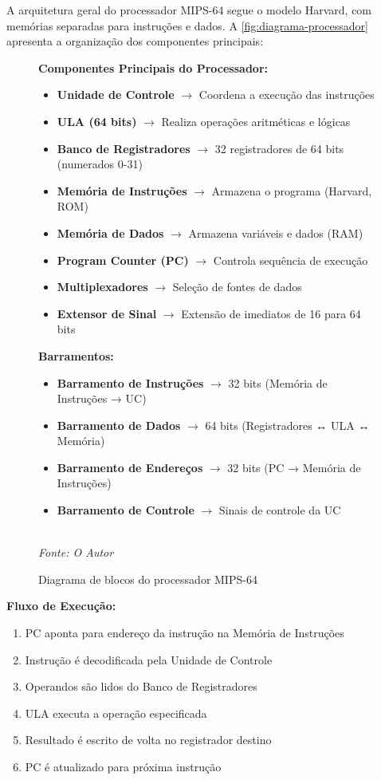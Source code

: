 \documentclass[
	12pt,				%
	oneside,
	a4paper,			%
	english,			%
	french,				%
	spanish,			%
	brazil,				%
	]{abntex2}
\begin{document}
A arquitetura geral do processador MIPS-64 segue o modelo Harvard, com memórias separadas para instruções e dados. A \autoref{fig:diagrama-processador} apresenta a organização dos componentes principais:

\begin{figure}[H]
\centering
\caption{Diagrama de blocos do processador MIPS-64}
\label{fig:diagrama-processador}
\begin{minipage}{0.9\textwidth}
\textbf{Componentes Principais do Processador:}
\begin{itemize}
    \item \textbf{Unidade de Controle} $\rightarrow$ Coordena a execução das instruções
    \item \textbf{ULA (64 bits)} $\rightarrow$ Realiza operações aritméticas e lógicas
    \item \textbf{Banco de Registradores} $\rightarrow$ 32 registradores de 64 bits (numerados 0-31)
    \item \textbf{Memória de Instruções} $\rightarrow$ Armazena o programa (Harvard, ROM)
    \item \textbf{Memória de Dados} $\rightarrow$ Armazena variáveis e dados (RAM)
    \item \textbf{Program Counter (PC)} $\rightarrow$ Controla sequência de execução
    \item \textbf{Multiplexadores} $\rightarrow$ Seleção de fontes de dados
    \item \textbf{Extensor de Sinal} $\rightarrow$ Extensão de imediatos de 16 para 64 bits
\end{itemize}

\textbf{Barramentos:}
\begin{itemize}
    \item \textbf{Barramento de Instruções} $\rightarrow$ 32 bits (Memória de Instruções → UC)
    \item \textbf{Barramento de Dados} $\rightarrow$ 64 bits (Registradores ↔ ULA ↔ Memória)
    \item \textbf{Barramento de Endereços} $\rightarrow$ 32 bits (PC → Memória de Instruções)
    \item \textbf{Barramento de Controle} $\rightarrow$ Sinais de controle da UC
\end{itemize}
\end{minipage}
\\
\textit{Fonte: O Autor}
\end{figure}

\textbf{Fluxo de Execução:}
\begin{enumerate}
    \item PC aponta para endereço da instrução na Memória de Instruções
    \item Instrução é decodificada pela Unidade de Controle  
    \item Operandos são lidos do Banco de Registradores
    \item ULA executa a operação especificada
    \item Resultado é escrito de volta no registrador destino
    \item PC é atualizado para próxima instrução
\end{enumerate}
\end{document}
